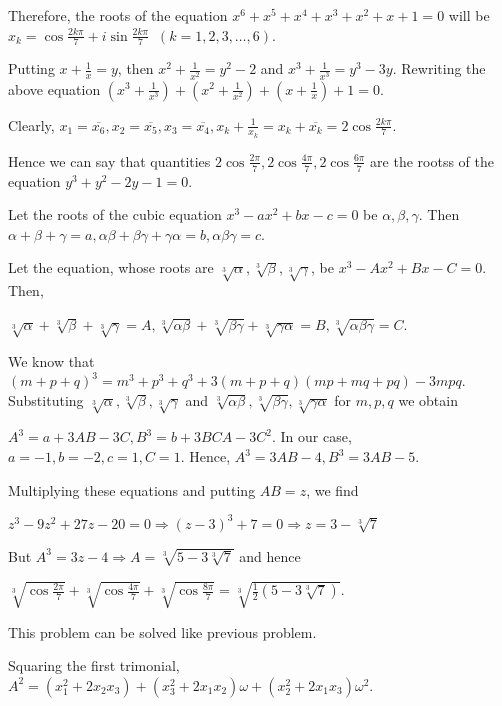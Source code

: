   Therefore, the roots of the equation $x^6 + x^5 + x^4 + x^3 + x^2 + x + 1 = 0$ will be $x_k =
  \cos\frac{2k\pi}{7} + i\sin\frac{2k\pi}{7}\;\;(k = 1, 2, 3, \ldots, 6)$.

  Putting $x + \frac{1}{x} = y$, then $x^2 + \frac{1}{x^2} = y^2 - 2$ and $x^3 + \frac{1}{x^3} = y^3 -
  3y$. Rewriting the above equation $\left(x^3 + \frac{1}{x^3}\right) + \left(x^2 + \frac{1}{x^2}\right) +
  \left(x + \frac{1}{x}\right) + 1 = 0$.

  Clearly, $x_1 = \overline{x_6}, x_2 = \overline{x_5}, x_3 = \overline{x_4}, x_k + \frac{1}{x_k} = x_k +
  \overline{x_k} = 2\cos\frac{2k\pi}{7}$.

  Hence we can say that quantities $2\cos\frac{2\pi}{7},
  2\cos\frac{4\pi}{7}, 2\cos\frac{6\pi}{7}$ are the rootss of the equation $y^3 + y^2 - 2y - 1 = 0$.

  Let the roots of the cubic equation $x^3 - ax^2 + bx - c = 0$ be $\alpha, \beta, \gamma$. Then $\alpha +
  \beta + \gamma = a, \alpha\beta + \beta\gamma + \gamma\alpha = b, \alpha\beta\gamma = c$.

  Let the equation, whose roots are $\sqrt[3]{\alpha}, \sqrt[3]{\beta}, \sqrt[3]{\gamma}$, be $x^3 - Ax^2 +
  Bx - C = 0$. Then,

  $\sqrt[3]{\alpha} + \sqrt[3]{\beta} + \sqrt[3]{\gamma} = A, \sqrt[3]{\alpha\beta} + \sqrt[3]{\beta\gamma}
  + \sqrt[3]{\gamma\alpha} = B, \sqrt[3]{\alpha\beta\gamma} = C$.

  We know that $(m + p + q)^3 = m^3 + p^3 + q^3 + 3(m + p + q)(mp + mq + pq) - 3mpq$. Substituting
  $\sqrt[3]{\alpha}, \sqrt[3]{\beta}, \sqrt[3]{\gamma}$ and $\sqrt[3]{\alpha\beta}, \sqrt[3]{\beta\gamma},
  \sqrt[3]{\gamma\alpha}$ for $m, p, q$ we obtain

  $A^3 = a + 3AB - 3C, B^3 = b + 3BCA - 3C^2$. In our case, $a = -1, b = -2, c = 1, C = 1$. Hence, $A^3 = 3AB
  - 4, B^3 = 3AB - 5$.

  Multiplying these equations and putting $AB = z$, we find

  $z^3 - 9z^2 + 27z - 20 = 0 \Rightarrow (z - 3)^3 + 7 = 0 \Rightarrow z = 3 - \sqrt[3]{7}$

  But $A^3 = 3z - 4 \Rightarrow A = \sqrt[3]{5 - 3\sqrt[3]{7}}$ and hence

  $\sqrt[3]{\cos\frac{2\pi}{7}} + \sqrt[3]{\cos\frac{4\pi}{7}} + \sqrt[3]{\cos\frac{8\pi}{7}} =
  \sqrt[3]{\frac{1}{2}(5 - 3\sqrt[3]{7})}$.
\item This problem can be solved like previous problem.
\item Squaring the first trimonial, $A^2 = (x_1^2 + 2x_2x_3) + (x_3^2 + 2x_1x_2)\omega + (x_2^2 +
  2x_1x_3)\omega^2$.

